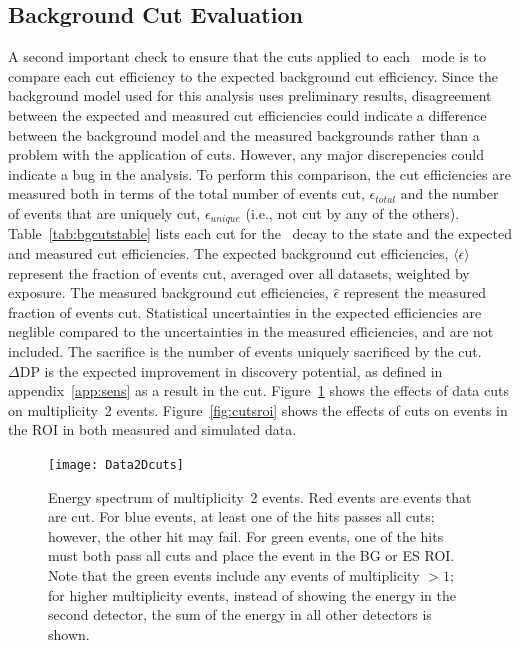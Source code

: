 \documentclass[/main.tex]{subfiles}
\begin{document}
\subsection{Background Cut Evaluation}
A second important check to ensure that the cuts applied to each \bbes\ mode is to compare each cut efficiency to the expected background cut efficiency.
Since the background model used for this analysis uses preliminary results, disagreement between the expected and measured cut efficiencies could indicate a difference between the background model and the measured backgrounds rather than a problem with the application of cuts.
However, any major discrepencies could indicate a bug in the analysis.
To perform this comparison, the cut efficiencies are measured both in terms of the total number of events cut, $\epsilon_{total}$ and the number of events that are uniquely cut, $\epsilon_{unique}$ (i.e., not cut by any of the others).
Table~\ref{tab:bgcutstable} lists each cut for the \bbes\ decay to the  state and the expected and measured cut efficiencies.
The expected background cut efficiencies, $\langle\epsilon\rangle$ represent the fraction of events cut, averaged over all datasets, weighted by exposure.
The measured background cut efficiencies, $\hat{\epsilon}$ represent the measured fraction of events cut.
Statistical uncertainties in the expected efficiencies are neglible compared to the uncertainties in the measured efficiencies, and are not included.
The sacrifice is the number of events uniquely sacrificed by the cut.
$\Delta \mathrm{DP}$ is the expected improvement in discovery potential, as defined in appendix~\ref{app:sens} as a result in the cut.
Figure~\ref{fig:datacuts2D} shows the effects of data cuts on multiplicity~2 events.
Figure~\ref{fig:cutsroi} shows the effects of cuts on events in the ROI in both measured and simulated data.

\begin{figure}
  \centering
  \texttt{[image: Data2Dcuts]}
  \caption[Effect of data cuts on measured multiplicity 2 events]{\label{fig:datacuts2D}
    Energy spectrum of multiplicity~2 events. Red events are events that are cut. For blue events, at least one of the hits passes all cuts; however, the other hit may fail. For green events, one of the hits must both pass all cuts and place the event in the BG or ES ROI. Note that the green events include any events of multiplicity $>1$; for higher multiplicity events, instead of showing the energy in the second detector, the sum of the energy in all other detectors is shown.
  }
\end{figure}
\end{document}
